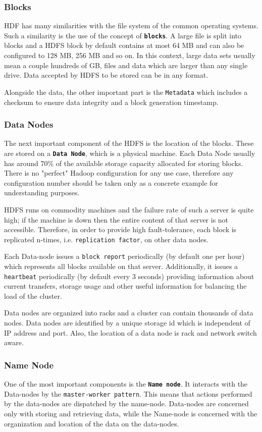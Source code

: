 \documentclass{sig-alternate}
\begin{document}
\subsubsection{Blocks}
HDF has many similarities with the file system of the common operating systems. Such a similarity is the use of the concept of \textbf{\texttt{blocks}}.
A large file is split into blocks and a HDFS block by default contains at most 64 MB and can also be configured to 128 MB, 256 MB and so on.
In this context, large data sets usually mean a couple hundreds of GB, files and data which are larger than any single drive.
Data accepted by HDFS to be stored can be in any format.

Alongside the data, the other important part is the \texttt{Metadata} which includes a checksum to ensure data integrity and a block generation timestamp.

\subsubsection{Data Nodes}
The next important component of the HDFS is the location of the blocks. These are stored on a \textbf{\texttt{Data Node}}, which is a physical machine. Each Data Node usually has around 70\% of the available storage capacity allocated for storing blocks. There is no "perfect" Hadoop configuration for any use case, therefore any configuration number should be taken only as a concrete example for understanding purposes.

HDFS runs on commodity machines and the failure rate of such a server is quite high; if the machine is down then the entire content of that server is not accessible. 
Therefore, in order to provide high fault-tolerance, each block is replicated n-times, i.e. \texttt{replication factor}, on other data nodes.

Each Data-node issues a \texttt{block report} periodically (by default one per hour) which represents all blocks available on that server.
Additionally, it issues a \texttt{heartbeat} periodically (by default every 3 seconds) providing information about current transfers, storage usage and other useful information for balancing the load of the cluster.

Data nodes are organized into racks and a cluster can contain thousands of data nodes. Data nodes are identified by a unique storage id which is independent of IP address and port. Also, the location of a data node is rack and network switch aware.

\subsubsection{Name Node}
One of the most important components is the \textbf{\texttt{Name node}}.
It interacts with the Data-nodes by the \texttt{master-worker pattern}.
This means that actions performed by the data-nodes are dispatched by the name-node. Data-nodes are concerned only with storing and retrieving data, while the Name-node is concerned with the organization and location of the data on the data-nodes.
\end{document}

